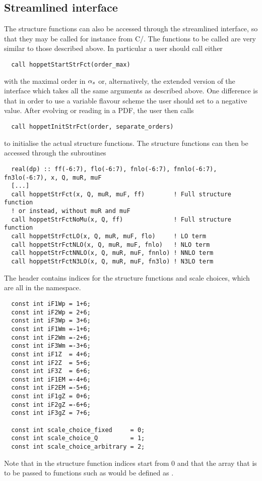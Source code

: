 \subsection{Streamlined interface}
\label{sec:structure-functions-streamlined}
The structure functions can also be accessed through the streamlined
interface, so that they may be called for instance from C/\CPP{}. The
functions to be called are very similar to those described above. In
particular a user should call either
\begin{lstlisting}
  call hoppetStartStrFct(order_max)
\end{lstlisting}
with  the maximal
order in $\alpha_s$ or, alternatively, the extended version of the interface
 which takes all the same arguments as
 described above. One difference is that in order to
use a variable flavour scheme the user should set  to a
negative value. After evolving or reading in a PDF, the user then calls
\begin{lstlisting}
  call hoppetInitStrFct(order, separate_orders)
\end{lstlisting}
to initialise the actual structure functions. The structure functions
can then be accessed through the subroutines
\begin{lstlisting}
  real(dp) :: ff(-6:7), flo(-6:7), fnlo(-6:7), fnnlo(-6:7), fn3lo(-6:7), x, Q, muR, muF
  [...]
  call hoppetStrFct(x, Q, muR, muF, ff)        ! Full structure function
  ! or instead, without muR and muF
  call hoppetStrFctNoMu(x, Q, ff)              ! Full structure function
  call hoppetStrFctLO(x, Q, muR, muF, flo)     ! LO term
  call hoppetStrFctNLO(x, Q, muR, muF, fnlo)   ! NLO term
  call hoppetStrFctNNLO(x, Q, muR, muF, fnnlo) ! NNLO term
  call hoppetStrFctN3LO(x, Q, muR, muF, fn3lo) ! N3LO term
\end{lstlisting}
The \CPP{} header contains indices for the structure functions and scale
choices, which are all in the  namespace.
%
\begin{lstlisting}
  const int iF1Wp = 1+6;
  const int iF2Wp = 2+6;
  const int iF3Wp = 3+6;
  const int iF1Wm =-1+6;
  const int iF2Wm =-2+6;
  const int iF3Wm =-3+6;
  const int iF1Z  = 4+6;
  const int iF2Z  = 5+6;
  const int iF3Z  = 6+6;
  const int iF1EM =-4+6;
  const int iF2EM =-5+6;
  const int iF1gZ = 0+6;
  const int iF2gZ =-6+6;
  const int iF3gZ = 7+6;

  const int scale_choice_fixed     = 0;
  const int scale_choice_Q         = 1;
  const int scale_choice_arbitrary = 2;
\end{lstlisting}
Note that in \CPP{} the structure function indices start from 0 and that the \CPP{}
array that is to be passed to functions such as 
would be defined as .

